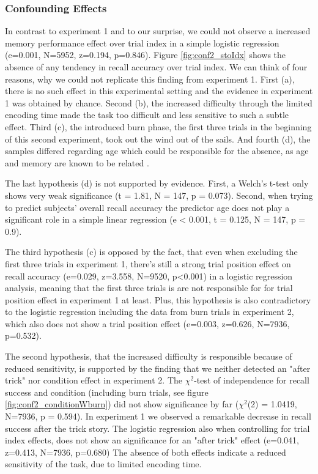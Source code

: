 \documentclass[a4paper,man,natbib,floatsintext,import]{apa6}
\begin{document}
\subsubsection{Confounding Effects}
In contrast to experiment 1 and to our surprise, we could not observe a increased memory performance effect over trial index in a simple logistic regression (e=0.001, N=5952, z=0.194, p=0.846). Figure \ref{fig:conf2_stoIdx} shows the absence of any tendency in recall accuracy over trial index. We can think of four reasons, why we could not replicate this finding from experiment 1.
First (a), there is no such effect in this experimental setting and the evidence in experiment 1 was obtained by chance. Second (b), the increased difficulty through the limited encoding time made the task too difficult and less sensitive to such a subtle effect. Third (c), the introduced burn phase, the first three trials in the beginning of this second experiment, took out the wind out of the sails. And fourth (d), the samples differed regarding age which could be responsible for the absence, as age and memory are known to be related \citep{Hasher1988}.

The last hypothesis (d) is not supported by evidence. First, a Welch's t-test only shows very weak significance (t = 1.81, N = 147, p = 0.073). Second, when trying to predict subjects' overall recall accuracy the predictor age does not play a significant role in a simple linear regression (e < 0.001, t = 0.125, N = 147, p = 0.9).

The third hypothesis (c) is opposed by the fact, that even when excluding the first three trials in experiment 1, there's still a strong trial position effect on recall accuracy (e=0.029, z=3.558, N=9520, p<0.001) in a logistic regression analysis, meaning that the first three trials is are not responsible for  for trial position effect in experiment 1 at least. Plus, this hypothesis is also contradictory to the logistic regression including the data from burn trials in experiment 2, which also does not show a trial position effect (e=0.003, z=0.626, N=7936, p=0.532).

The second hypothesis, that the increased difficulty is responsible because of reduced sensitivity, is supported by the finding that we neither detected an "after trick" nor condition effect in experiment 2. The ${\chi}^2$-test of independence for recall success and condition (including burn trials, see figure \ref{fig:conf2_conditionWburn}) did not show significance by far (${\chi}^2$(2) = 1.0419, N=7936, p = 0.594). In experiment 1 we observed a remarkable decrease in recall success after the trick story. The logistic regression also when controlling for trial index effects, does not show an significance for an "after trick" effect (e=0.041, z=0.413, N=7936, p=0.680) The absence of both effects indicate a reduced sensitivity of the task, due to limited encoding time.
\end{document}
